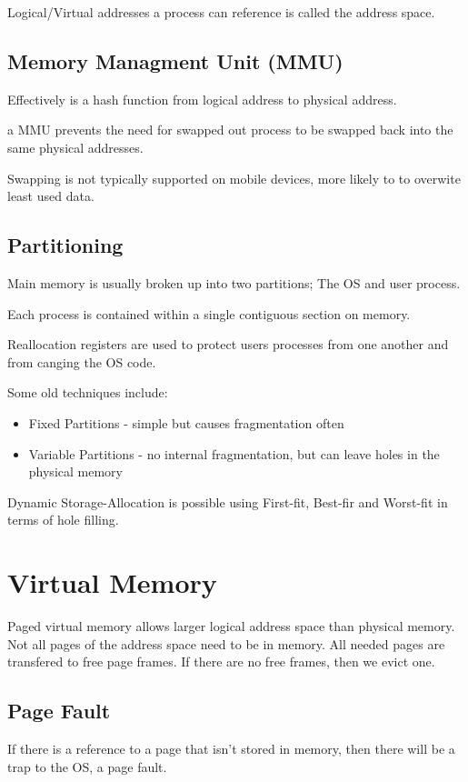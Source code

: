 \documentclass{article}
\begin{document}
Logical/Virtual addresses a process can reference is called the address space.

\subsection{Memory Managment Unit (MMU)}
Effectively is a hash function from logical address to physical address.

a MMU prevents the need for swapped out process to be swapped back into the same physical addresses.

Swapping is not typically supported on mobile devices, more likely to to overwite least used data.


\subsection{Partitioning}
Main memory is usually broken up into two partitions; The OS and user process.

Each process is contained within a single contiguous section on memory.

Reallocation registers are used to protect users processes from one another and from canging the OS code.

Some old techniques include:
\begin{itemize}
    \item Fixed Partitions - simple but causes fragmentation often
    \item Variable Partitions - no internal fragmentation, but can leave holes in the physical memory
\end{itemize}

Dynamic Storage-Allocation is possible using First-fit, Best-fir and Worst-fit in terms of hole filling.

\section{Virtual Memory}
Paged virtual memory allows larger logical address space than physical memory.
Not all pages of the address space need to be in memory. All needed pages are transfered to free page frames.
If there are no free frames, then we evict one.

\subsection{Page Fault}
If there is a reference to a page that isn't stored in memory, then there will be a trap to the OS, a page fault.
\end{document}
